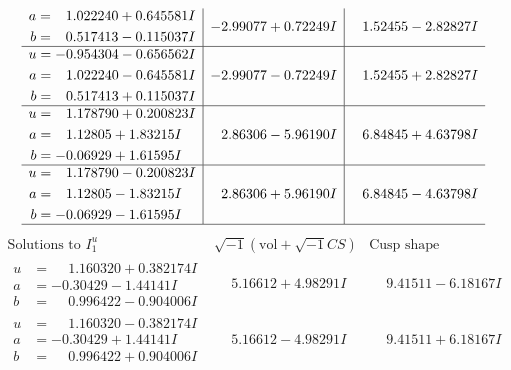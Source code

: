 \documentclass[1p]{elsarticle_modified}
\theoremstyle{definition}
\newcommand{\I}{\sqrt{-1}}
\begin{document}
$$\begin{array}{c|c|c}
\begin{aligned}
a &= \phantom{-}1.022240 + 0.645581 I \\
b &= \phantom{-}0.517413 - 0.115037 I\end{aligned}
 & -2.99077 + 0.72249 I & \phantom{-}1.52455 - 2.82827 I \\ \hline\begin{aligned}
u &= -0.954304 - 0.656562 I \\
a &= \phantom{-}1.022240 - 0.645581 I \\
b &= \phantom{-}0.517413 + 0.115037 I\end{aligned}
 & -2.99077 - 0.72249 I & \phantom{-}1.52455 + 2.82827 I \\ \hline\begin{aligned}
u &= \phantom{-}1.178790 + 0.200823 I \\
a &= \phantom{-}1.12805 + 1.83215 I \\
b &= -0.06929 + 1.61595 I\end{aligned}
 & \phantom{-}2.86306 - 5.96190 I & \phantom{-}6.84845 + 4.63798 I \\ \hline\begin{aligned}
u &= \phantom{-}1.178790 - 0.200823 I \\
a &= \phantom{-}1.12805 - 1.83215 I \\
b &= -0.06929 - 1.61595 I\end{aligned}
 & \phantom{-}2.86306 + 5.96190 I & \phantom{-}6.84845 - 4.63798 I\\
 \hline 
 \end{array}$$\newpage$$\begin{array}{c|c|c}  
\text{Solutions to }I^u_{1}& \I (\text{vol} + \sqrt{-1}CS) & \text{Cusp shape}\\
 \hline 
\begin{aligned}
u &= \phantom{-}1.160320 + 0.382174 I \\
a &= -0.30429 - 1.44141 I \\
b &= \phantom{-}0.996422 - 0.904006 I\end{aligned}
 & \phantom{-}5.16612 + 4.98291 I & \phantom{-}9.41511 - 6.18167 I \\ \hline\begin{aligned}
u &= \phantom{-}1.160320 - 0.382174 I \\
a &= -0.30429 + 1.44141 I \\
b &= \phantom{-}0.996422 + 0.904006 I\end{aligned}
 & \phantom{-}5.16612 - 4.98291 I & \phantom{-}9.41511 + 6.18167 I \\ \hline\begin{aligned}

\end{aligned}
\end{array}$$
\end{document}
